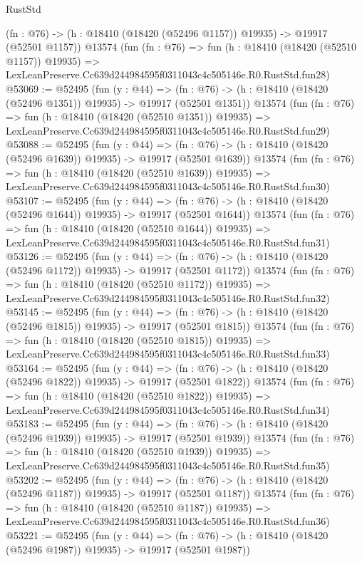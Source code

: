 \begin{lexlean}{RustStd}
\begin{coremodule}
    (fn : @76) -> (h : @18410 (@18420 (@52496 @1157)) @19935) -> @19917 (@52501 @1157))
    @13574
    (fun (fn : @76) =>
    fun (h : @18410 (@18420 (@52510 @1157)) @19935) =>
    LexLeanPreserve.Cc639d244984595f0311043c4c505146e.R0.RustStd.fun28)
@53069 := @52495
    (fun (y : @44) =>
    (fn : @76) -> (h : @18410 (@18420 (@52496 @1351)) @19935) -> @19917 (@52501 @1351))
    @13574
    (fun (fn : @76) =>
    fun (h : @18410 (@18420 (@52510 @1351)) @19935) =>
    LexLeanPreserve.Cc639d244984595f0311043c4c505146e.R0.RustStd.fun29)
@53088 := @52495
    (fun (y : @44) =>
    (fn : @76) -> (h : @18410 (@18420 (@52496 @1639)) @19935) -> @19917 (@52501 @1639))
    @13574
    (fun (fn : @76) =>
    fun (h : @18410 (@18420 (@52510 @1639)) @19935) =>
    LexLeanPreserve.Cc639d244984595f0311043c4c505146e.R0.RustStd.fun30)
@53107 := @52495
    (fun (y : @44) =>
    (fn : @76) -> (h : @18410 (@18420 (@52496 @1644)) @19935) -> @19917 (@52501 @1644))
    @13574
    (fun (fn : @76) =>
    fun (h : @18410 (@18420 (@52510 @1644)) @19935) =>
    LexLeanPreserve.Cc639d244984595f0311043c4c505146e.R0.RustStd.fun31)
@53126 := @52495
    (fun (y : @44) =>
    (fn : @76) -> (h : @18410 (@18420 (@52496 @1172)) @19935) -> @19917 (@52501 @1172))
    @13574
    (fun (fn : @76) =>
    fun (h : @18410 (@18420 (@52510 @1172)) @19935) =>
    LexLeanPreserve.Cc639d244984595f0311043c4c505146e.R0.RustStd.fun32)
@53145 := @52495
    (fun (y : @44) =>
    (fn : @76) -> (h : @18410 (@18420 (@52496 @1815)) @19935) -> @19917 (@52501 @1815))
    @13574
    (fun (fn : @76) =>
    fun (h : @18410 (@18420 (@52510 @1815)) @19935) =>
    LexLeanPreserve.Cc639d244984595f0311043c4c505146e.R0.RustStd.fun33)
@53164 := @52495
    (fun (y : @44) =>
    (fn : @76) -> (h : @18410 (@18420 (@52496 @1822)) @19935) -> @19917 (@52501 @1822))
    @13574
    (fun (fn : @76) =>
    fun (h : @18410 (@18420 (@52510 @1822)) @19935) =>
    LexLeanPreserve.Cc639d244984595f0311043c4c505146e.R0.RustStd.fun34)
@53183 := @52495
    (fun (y : @44) =>
    (fn : @76) -> (h : @18410 (@18420 (@52496 @1939)) @19935) -> @19917 (@52501 @1939))
    @13574
    (fun (fn : @76) =>
    fun (h : @18410 (@18420 (@52510 @1939)) @19935) =>
    LexLeanPreserve.Cc639d244984595f0311043c4c505146e.R0.RustStd.fun35)
@53202 := @52495
    (fun (y : @44) =>
    (fn : @76) -> (h : @18410 (@18420 (@52496 @1187)) @19935) -> @19917 (@52501 @1187))
    @13574
    (fun (fn : @76) =>
    fun (h : @18410 (@18420 (@52510 @1187)) @19935) =>
    LexLeanPreserve.Cc639d244984595f0311043c4c505146e.R0.RustStd.fun36)
@53221 := @52495
    (fun (y : @44) =>
    (fn : @76) -> (h : @18410 (@18420 (@52496 @1987)) @19935) -> @19917 (@52501 @1987))

\end{coremodule}
\end{lexlean}
